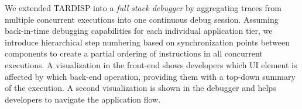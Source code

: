 We extended TARDISP into a \emph{full stack debugger} by aggregating traces from multiple concurrent executions into one continuous debug session.
Assuming back-in-time debugging capabilities for each individual application tier, 
we introduce hierarchical step numbering based on synchronization points between components to create a partial ordering of instructions in all concurrent executions.
A visualization in the front-end shows developers which UI element is affected by which back-end operation, providing them with a top-down summary of the execution.
A second visualization is shown in the debugger and helps developers to navigate the application flow.



